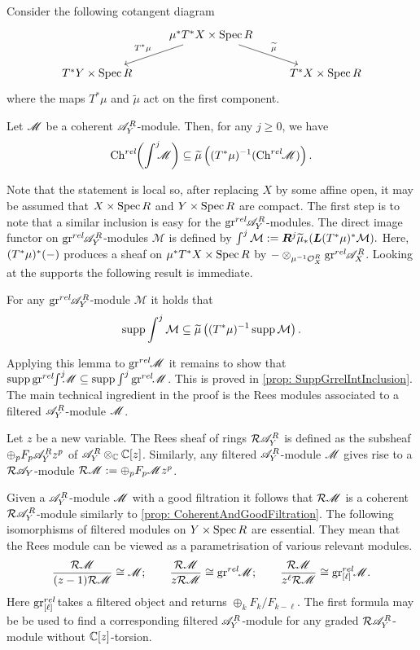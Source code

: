 \noindent
Consider the following cotangent diagram
$$
\begin{tikzcd}
    & \mu^* T^* X\times \Spec R \arrow[swap]{ld}{T^* \mu} \arrow{rd}{\widetilde{\mu}} & \\
    T^* Y\times \Spec R & & T^*X\times \Spec R
\end{tikzcd}
$$
where the maps $T^*\mu$ and $\widetilde{\mu}$ act on the first component.
\begin{theorem}\label{thm: KashiwaraEstimate}
    Let $\mathscr{M}$ be a coherent $\mathscr{A}_Y^R$-module. Then, for any $j\geq 0$, we have
    $$\operatorname{Ch}^{rel}\mkern-5mu\left(\int^j \mkern -8mu \mathscr{M} \right)\subseteq  \widetilde{\mu}\left((T^*\mu)^{-1}(\operatorname{Ch}^{rel}\mkern-5mu \mathscr{M}) \right).$$
\end{theorem}
Note that the statement is local so, after replacing $X$ by some affine open, it may be assumed that $X\times \operatorname{Spec} R$ and $Y\times \operatorname{Spec} R$ are compact.
The first step is to note that a similar inclusion is easy for the $\operatorname{gr}^{rel}\mkern-5mu \mathscr{A}_Y^R$-modules.
The direct image functor on $\operatorname{gr}^{rel}\mkern-5mu \mathscr{A}_Y^R$-modules $\mathcal{M}$ is defined by $\int^j \mathcal{M} :=  \boldsymbol{R}^j \widetilde{\mu}_* ( \boldsymbol{L}(T^*\mu)^*\mathcal{M}).$
Here, $(T^*\mu)^*({-})$ produces a sheaf on $\mu^*T^*X\times \operatorname{Spec} R$ by $ {-}\otimes_{\mu^{-1}\mathcal{O}_X^R} \operatorname{gr}^{rel}\mkern-5mu \mathscr{A}_X^R$.
Looking at the supports the following result is immediate.
\begin{lemma}
    For any $\operatorname{gr}^{rel}\mkern-5mu\mathscr{A}_Y^R$-module $\mathcal{M}$ it holds that
    $$\operatorname{supp} \int^j \mathcal{M}\subseteq \widetilde{\mu}\left((T^* \mu)^{-1} \operatorname{supp} \mathcal{M}\right).$$
\end{lemma}
Applying this lemma to $\operatorname{gr}^{rel}\mkern-5mu\mathscr{M}$ it remains to show that $\operatorname{supp}\operatorname{gr}^{rel}\mkern-5mu\int^j \mkern -8mu\mathscr{M}\subseteq \operatorname{supp}\int^j \operatorname{gr}^{rel}\mkern-5mu\mathscr{M}$. This is proved in \cref{prop: SuppGrrelIntInclusion}. The main technical ingredient in the proof is the Rees modules associated to a filtered $\mathscr{A}_Y^R$-module $\mathscr{M}$.
\begin{definition}
    Let $z$ be a new variable. The Rees sheaf of rings $\mathcal{R}\mathscr{A}_Y^R$ is defined as the subsheaf $\oplus_p F_p \mathscr{A}_Y^R z^p $ of $\mathscr{A}_Y^R \otimes_{\mathbb{C}} \mathbb{C}[z]$. Similarly, any filtered $\mathscr{A}_Y^R$-module $\mathscr{M}$ gives rise to a $\mathcal{R}\mathscr{A}_Y$-module $\mathcal{R}\mathscr{M} := \oplus_p F_p \mathscr{M} z^p$.
\end{definition}
Given a $\mathscr{A}_Y^R$-module $\mathscr{M}$ with a good filtration it follows that $\mathcal{R}\mathscr{M}$ is a coherent $\mathcal{R}\mathscr{A}_Y^R$-module similarly to \cref{prop: CoherentAndGoodFiltration}.
The following isomorphisms of filtered modules on $Y\times \operatorname{Spec} R$ are essential.
They mean that the Rees module can be viewed as a parametrisation of various relevant modules.
$$\frac{\mathcal{R}\mathscr{M}}{(z-1)\mathcal{R}\mathscr{M}} \cong \mathscr{M}; \qquad \frac{\mathcal{R}\mathscr{M}}{z\mathcal{R}\mathscr{M}} \cong \operatorname{gr}^{rel}\mkern-5mu \mathscr{M};\qquad \frac{\mathcal{R}\mathscr{M}}{z^\ell\mathcal{R}\mathscr{M}} \cong  \operatorname{gr}_{[\ell]}^{rel}\mkern-5mu\mathscr{M}.$$
Here $\operatorname{gr}_{[\ell]}^{rel}\mkern-5mu$ takes a filtered object and returns $\oplus_k F_{k}/F_{k-\ell}$.
The first formula may be be used to find a corresponding filtered $\mathscr{A}_Y^R$-module for any graded $\mathcal{R}\mathscr{A}_Y^R$-module without $\mathbb{C}[z]$-torsion.

